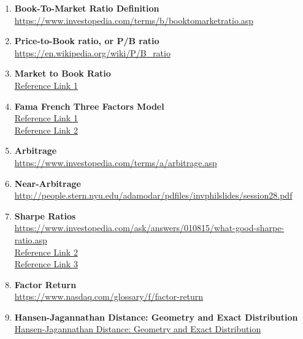 \begin{enumerate}
    
        \item\textbf{Book-To-Market Ratio Definition} \\     \url{https://www.investopedia.com/terms/b/booktomarketratio.asp}

        \item\textbf{Price-to-Book ratio, or P/B ratio} \\
        \url{https://en.wikipedia.org/wiki/P/B_ratio}

        \item\textbf{Market to Book Ratio} \\
        \href{https://www.youtube.com/watch?v=aPoHIdaMPuI}{Reference Link 1} 
 
        \item\textbf{Fama French Three Factors Model}  \\ 
          \href{https://www.youtube.com/watch?v=qeNBAKtAIHo}{Reference Link 1} \\
          \href{https://www.youtube.com/watch?v=pYTraS5WR3s&list=PLsJJSEojXyUHWidbRoBGR0mBgEkXVAkKM&index=2&t=0s}{Reference Link 2} 
  
        \item\textbf{Arbitrage} \\ 
          \url{https://www.investopedia.com/terms/a/arbitrage.asp}
         
        \item\textbf{Near-Arbitrage} \\
          \url{http://people.stern.nyu.edu/adamodar/pdfiles/invphilslides/session28.pdf}
          
        \item\textbf{Sharpe Ratios} \\
        \url{https://www.investopedia.com/ask/answers/010815/what-good-sharpe-ratio.asp} \\
        \href{https://www.zhihu.com/question/264210987}{Reference Link 2} \\
        \href{https://www.youtube.com/watch?v=fWnyg0UeQkg}{Reference Link 3} 
            
        \item\textbf{Factor Return} \\ 
        \url{https://www.nasdaq.com/glossary/f/factor-return} 
   
        \item\textbf{Hansen-Jagannathan Distance:  Geometry and Exact Distribution} \\
        \url{Hansen-Jagannathan Distance:  Geometry and Exact Distribution} 
        

\end{enumerate}
